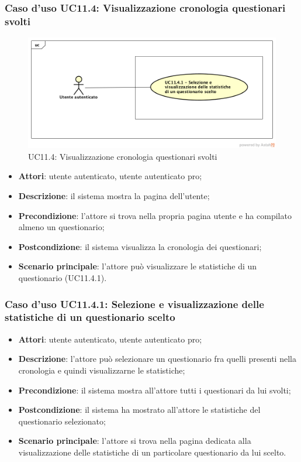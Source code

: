 \subsubsection{Caso d'uso UC11.4: Visualizzazione cronologia questionari svolti}
\label{UC11.4}
\begin{figure}[h]
	\centering
	\includegraphics[scale=0.5]{UML/UC11_4.png}
	\caption{UC11.4: Visualizzazione cronologia questionari svolti}
\end{figure}
\begin{itemize}
\item\textbf{Attori}: utente autenticato, utente autenticato pro;
\item\textbf{Descrizione}: il sistema mostra la pagina dell'utente;
\item\textbf{Precondizione}: l'attore si trova nella propria pagina utente e ha compilato almeno un questionario;
\item\textbf{Postcondizione}: il sistema visualizza la cronologia dei questionari;
\item\textbf{Scenario principale}: l'attore può visualizzare le statistiche di un questionario (UC11.4.1).
\end{itemize}

\subsubsection{Caso d'uso UC11.4.1: Selezione e visualizzazione delle statistiche di un questionario scelto}
\begin{itemize}
\item\textbf{Attori}: utente autenticato, utente autenticato pro;
\item\textbf{Descrizione}: l'attore può selezionare un questionario fra quelli presenti nella cronologia e quindi visualizzarne le statistiche;
\item\textbf{Precondizione}: il sistema mostra all'attore tutti i questionari da lui svolti;
\item\textbf{Postcondizione}: il sistema ha mostrato all'attore le statistiche del questionario selezionato;
\item\textbf{Scenario principale}: l'attore si trova nella pagina dedicata alla visualizzazione delle statistiche di un particolare questionario da lui scelto.
\end{itemize}

